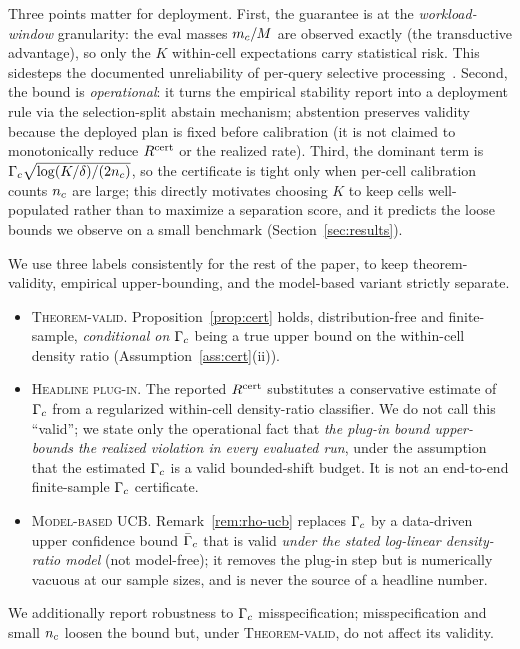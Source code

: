 Three points matter for deployment. First, the guarantee is at the \emph{workload-window} granularity: the eval masses $m_c/M$ are observed exactly (the transductive advantage), so only the $K$ within-cell expectations carry statistical risk. This sidesteps the documented unreliability of per-query selective processing~\cite{qpplimits2025}. Second, the bound is \emph{operational}: it turns the empirical stability report into a deployment rule via the selection-split abstain mechanism; abstention preserves validity because the deployed plan is fixed before calibration (it is not claimed to monotonically reduce $R^{\mathrm{cert}}$ or the realized rate). Third, the dominant term is $\Gamma_c\sqrt{\log(K/\delta)/(2n_c)}$, so the certificate is tight only when per-cell calibration counts $n_c$ are large; this directly motivates choosing $K$ to keep cells well-populated rather than to maximize a separation score, and it predicts the loose bounds we observe on a small benchmark (Section~\ref{sec:results}).

 We use three labels consistently for the rest of the paper, to keep theorem-validity, empirical upper-bounding, and the model-based variant strictly separate.
\begin{itemize}\itemsep1pt\setlength{\leftmargini}{1.2em}
\item \textsc{Theorem-valid}. Proposition~\ref{prop:cert} holds, distribution-free and finite-sample, \emph{conditional on} $\Gamma_c$ being a true upper bound on the within-cell density ratio (Assumption~\ref{ass:cert}(ii)).
\item \textsc{Headline plug-in}. The reported $R^{\mathrm{cert}}$ substitutes a conservative estimate of $\Gamma_c$ from a regularized within-cell density-ratio classifier. We do not call this ``valid''; we state only the operational fact that \emph{the plug-in bound upper-bounds the realized violation in every evaluated run}, under the assumption that the estimated $\Gamma_c$ is a valid bounded-shift budget. It is not an end-to-end finite-sample $\Gamma_c$ certificate.
\item \textsc{Model-based UCB}. Remark~\ref{rem:rho-ucb} replaces $\Gamma_c$ by a data-driven upper confidence bound $\bar\Gamma_c$ that is valid \emph{under the stated log-linear density-ratio model} (not model-free); it removes the plug-in step but is numerically vacuous at our sample sizes, and is never the source of a headline number.
\end{itemize}
We additionally report robustness to $\Gamma_c$ misspecification; misspecification and small $n_c$ loosen the bound but, under \textsc{Theorem-valid}, do not affect its validity.

